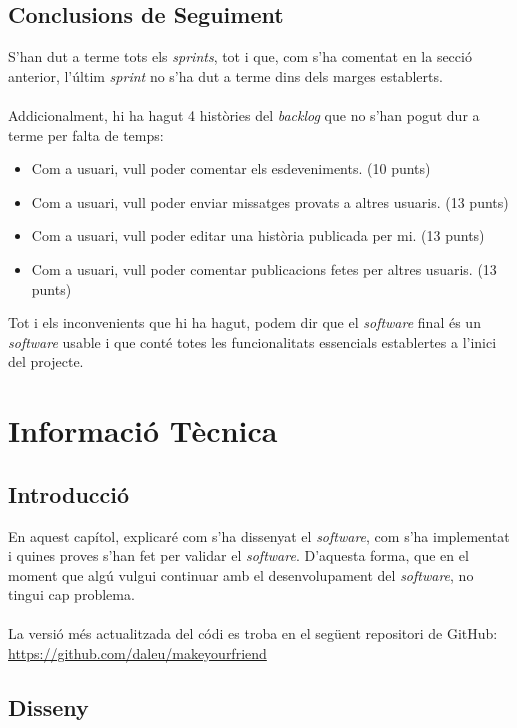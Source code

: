 \documentclass[11pt,catalan,listoffigures,listoftables]{tfgetsinf}
\begin{document}
\section{Conclusions de Seguiment}

S'han dut a terme tots els \textit{sprints}, tot i que, com s'ha comentat en la secció anterior, l'últim \textit{sprint} no s'ha dut a terme dins dels marges establerts.\\ \\
Addicionalment, hi ha hagut 4 històries del \textit{backlog} que no s'han pogut dur a terme per falta de temps:
\begin{itemize}
\item Com a usuari, vull poder comentar els esdeveniments. (10 punts)
\item Com a usuari, vull poder enviar missatges provats a altres usuaris. (13 punts)
\item Com a usuari, vull poder editar una història publicada per mi. (13 punts)
\item Com a usuari, vull poder comentar publicacions fetes per altres usuaris. (13 punts)
\end{itemize}
Tot i els inconvenients que hi ha hagut, podem dir que el \textit{software} final és un \textit{software} usable i que conté totes les funcionalitats essencials establertes a l'inici del projecte.

\chapter{Informació Tècnica}

\section{Introducció}

En aquest capítol, explicaré com s'ha dissenyat el \textit{software}, com s'ha implementat i quines proves s'han fet per validar el \textit{software}. D'aquesta forma, que en el moment que algú vulgui continuar amb el desenvolupament del \textit{software}, no tingui cap problema.\\ \\
La versió més actualitzada del códi es troba en el següent repositori de GitHub:\\
\url{https://github.com/daleu/makeyourfriend}

\section{Disseny}
\end{document}
